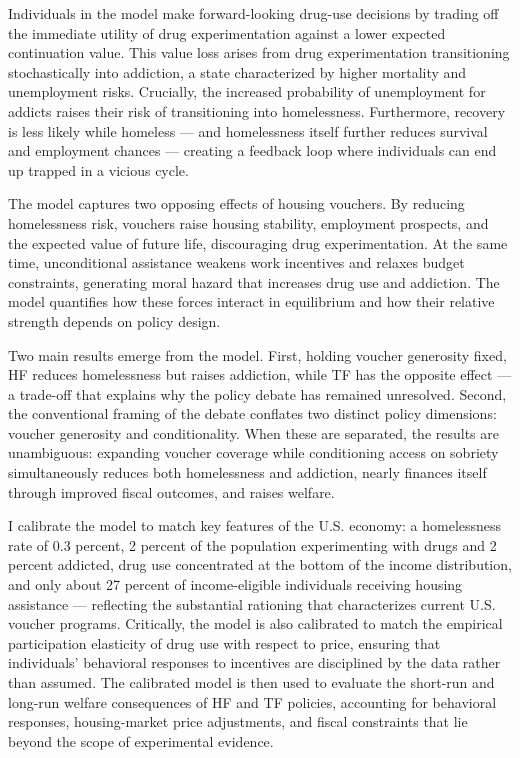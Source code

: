 \documentclass[parskip=full]{article}
\theoremstyle{plain}
\theoremstyle{definition}
\theoremstyle{remark}
\begin{document}
Individuals in the model make forward-looking drug-use decisions by trading off the immediate utility of drug experimentation against a lower expected continuation value. This value loss arises from drug experimentation transitioning stochastically into addiction, a state characterized by higher mortality and unemployment risks. Crucially, the increased probability of unemployment for addicts raises their risk of transitioning into homelessness. Furthermore, recovery is less likely while homeless — and homelessness itself further reduces survival and employment chances — creating a feedback loop where individuals can end up trapped in a vicious cycle.

The model captures two opposing effects of housing vouchers. By reducing homelessness risk, vouchers raise housing stability, employment prospects, and the expected value of future life, discouraging drug experimentation. At the same time, unconditional assistance weakens work incentives and relaxes budget constraints, generating moral hazard that increases drug use and addiction. The model quantifies how these forces interact in equilibrium and how their relative strength depends on policy design.

Two main results emerge from the model. First, holding voucher generosity fixed, HF reduces homelessness but raises addiction, while TF has the opposite effect — a trade-off that explains why the policy debate has remained unresolved. Second, the conventional framing of the debate conflates two distinct policy dimensions: voucher generosity and conditionality. When these are separated, the results are unambiguous: expanding voucher coverage while conditioning access on sobriety simultaneously reduces both homelessness and addiction, nearly finances itself through improved fiscal outcomes, and raises welfare.

I calibrate the model to match key features of the U.S. economy: a homelessness rate of 0.3 percent, 2 percent of the population experimenting with drugs and 2 percent addicted, drug use concentrated at the bottom of the income distribution, and only about 27 percent of income-eligible individuals receiving housing assistance — reflecting the substantial rationing that characterizes current U.S. voucher programs. Critically, the model is also calibrated to match the empirical participation elasticity of drug use with respect to price, ensuring that individuals' behavioral responses to incentives are disciplined by the data rather than assumed. The calibrated model is then used to evaluate the short-run and long-run welfare consequences of HF and TF policies, accounting for behavioral responses, housing-market price adjustments, and fiscal constraints that lie beyond the scope of experimental evidence.
\end{document}

